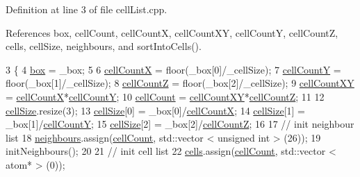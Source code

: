 Definition at line 3 of file cell\+List.\+cpp.



References box, cell\+Count, cell\+Count\+X, cell\+Count\+X\+Y, cell\+Count\+Y, cell\+Count\+Z, cells, cell\+Size, neighbours, and sort\+Into\+Cells().


\begin{DoxyCode}
3                                                                                           \{
4                 \hyperlink{classcell_list_ae65748b80d5e06edfa22daaf569f2757}{box} = \_box;
5                                 
6                 \hyperlink{classcell_list_a342f802c342f51f3c1aa4dab7d7a4d84}{cellCountX} = floor(\_box[0]/\_cellSize);
7                 \hyperlink{classcell_list_aa0c942e7b0b61cda1d688ffc96e8f1c8}{cellCountY} = floor(\_box[1]/\_cellSize);
8                 \hyperlink{classcell_list_a2b506715c6ded7cb9fadf994f4f01785}{cellCountZ} = floor(\_box[2]/\_cellSize);
9                 \hyperlink{classcell_list_a619d607f8569876cead1bdfad239d4b2}{cellCountXY} = \hyperlink{classcell_list_a342f802c342f51f3c1aa4dab7d7a4d84}{cellCountX}*\hyperlink{classcell_list_aa0c942e7b0b61cda1d688ffc96e8f1c8}{cellCountY};
10                 \hyperlink{classcell_list_a6a695015c180229cd491db58c6e18ff4}{cellCount} = \hyperlink{classcell_list_a619d607f8569876cead1bdfad239d4b2}{cellCountXY}*\hyperlink{classcell_list_a2b506715c6ded7cb9fadf994f4f01785}{cellCountZ};
11                 
12                 \hyperlink{classcell_list_ac920f36bcf43f79ab853921bb0b7c2f4}{cellSize}.resize(3);
13                 \hyperlink{classcell_list_ac920f36bcf43f79ab853921bb0b7c2f4}{cellSize}[0] = \_box[0]/\hyperlink{classcell_list_a342f802c342f51f3c1aa4dab7d7a4d84}{cellCountX};
14                 \hyperlink{classcell_list_ac920f36bcf43f79ab853921bb0b7c2f4}{cellSize}[1] = \_box[1]/\hyperlink{classcell_list_aa0c942e7b0b61cda1d688ffc96e8f1c8}{cellCountY};
15                 \hyperlink{classcell_list_ac920f36bcf43f79ab853921bb0b7c2f4}{cellSize}[2] = \_box[2]/\hyperlink{classcell_list_a2b506715c6ded7cb9fadf994f4f01785}{cellCountZ};
16 
17                 \textcolor{comment}{// init neighbour list}
18                 \hyperlink{classcell_list_ada607886d0e5a20d710dde694d6d989f}{neighbours}.assign(\hyperlink{classcell_list_a6a695015c180229cd491db58c6e18ff4}{cellCount}, std::vector < unsigned int > (26));
19                 initNeighbours();
20                 
21                 \textcolor{comment}{// init cell list}
22                 \hyperlink{classcell_list_a10bc0c3ae819293b1e88bc7d1bfdb2aa}{cells}.assign(\hyperlink{classcell_list_a6a695015c180229cd491db58c6e18ff4}{cellCount}, std::vector < atom* > (0));

\end{DoxyCode}
